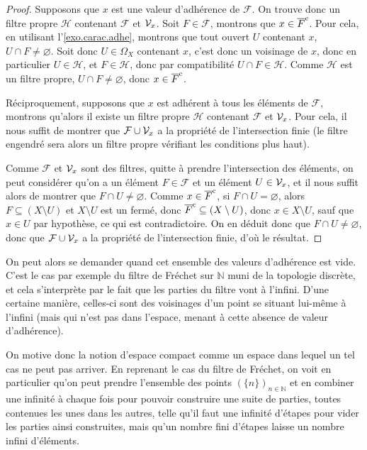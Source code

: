 \begin{proof}
  Supposons que $x$ est une valeur d'adhérence de $\mathcal F$. On trouve donc
  un filtre propre $\mathcal H$ contenant $\mathcal F$ et $\mathcal{V}_x$. Soit
  $F\in\mathcal F$, montrons que $x\in \overline{F}^{\mathrm c}$. Pour cela, en utilisant
  l'\cref{exo.carac.adhe}, montrons que
  tout ouvert $U$ contenant $x$, $U\cap F\neq\varnothing$. Soit donc
  $U\in \Omega_X$ contenant $x$, c'est donc un voisinage de $x$, donc en
  particulier $U\in\mathcal H$, et $F\in\mathcal H$, donc par compatibilité
  $U\cap F \in\mathcal H$. Comme $\mathcal H$ est un filtre propre,
  $U\cap F \neq \varnothing$, donc $x\in\overline{F}^{\mathrm c}$.

  Réciproquement, supposons que $x$ est adhérent à tous les éléments de
  $\mathcal F$, montrons qu'alors il existe un filtre propre $\mathcal H$
  contenant $\mathcal F$ et $\mathcal{V}_x$. Pour cela, il nous suffit de montrer que
  $\mathcal F\cup\mathcal{V}_x$ a la propriété de l'intersection finie (le filtre
  engendré sera alors un filtre propre vérifiant les conditions plus haut).

  Comme $\mathcal F$ et $\mathcal{V}_x$ sont des filtres, quitte à prendre
  l'intersection des éléments, on peut considérer qu'on a un élément
  $F\in\mathcal F$ et un élément $U\in\mathcal{V}_x$, et il nous suffit alors de
  montrer que $F\cap U \neq\varnothing$. Comme $x\in\overline{F}^{\mathrm c}$, si
  $F\cap U = \varnothing$, alors $F\subseteq (X\setminus U)$ et $X\setminus U$
  est un fermé, donc $\overline{F}^{\mathrm c} \subseteq (X\setminus U)$, donc
  $x\in X\setminus U$, sauf que $x\in U$ par hypothèse, ce qui est
  contradictoire. On en déduit donc que $F\cap U \neq\varnothing$, donc que
  $\mathcal F\cup\mathcal{V}_x$ a la propriété de l'intersection finie, d'où le
  résultat.
\end{proof}

On peut alors se demander quand cet ensemble des valeurs d'adhérence est vide.
C'est le cas par exemple du filtre de Fréchet sur $\mathbb N$ muni de la
topologie discrète, et cela s'interprète par le fait que les parties du filtre
vont à l'infini. D'une certaine manière, celles-ci sont des voisinages d'un
point se situant lui-même à l'infini (mais qui n'est pas dans l'espace, menant
à cette absence de valeur d'adhérence).

On motive donc la notion d'espace compact comme un espace dans lequel un tel cas
ne peut pas arriver. En reprenant le cas du filtre de Fréchet, on voit en
particulier qu'on peut prendre l'ensemble des points
$(\{n\})_{n\in\mathbb N}$ et en combiner une infinité à chaque fois pour
pouvoir construire une suite de parties, toutes contenues les unes dans
les autres, telle qu'il faut une infinité d'étapes pour vider les parties
ainsi construites, mais qu'un nombre fini d'étapes laisse un nombre infini
d'éléments.

